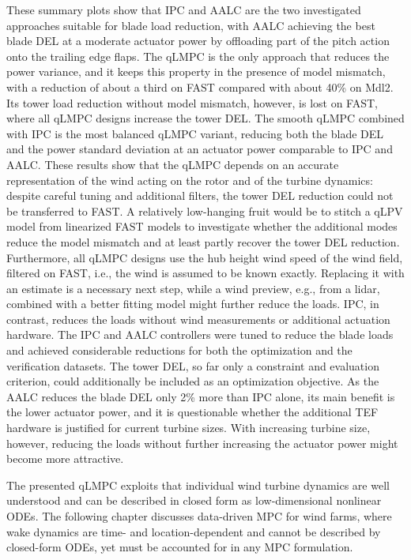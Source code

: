 These summary plots show that IPC and AALC are the two investigated approaches suitable for blade load reduction, with AALC achieving the best blade DEL at a moderate actuator power by offloading part of the pitch action onto the trailing edge flaps. The qLMPC is the only approach that reduces the power variance, and it keeps this property in the presence of model mismatch, with a reduction of about a third on FAST compared with about 40\% on Mdl2. Its tower load reduction without model mismatch, however, is lost on FAST, where all qLMPC designs increase the tower DEL. The smooth qLMPC combined with IPC is the most balanced qLMPC variant, reducing both the blade DEL and the power standard deviation at an actuator power comparable to IPC and AALC.
%
These results show that the qLMPC depends on an accurate representation of the wind acting on the rotor and of the turbine dynamics: despite careful tuning and additional filters, the tower DEL reduction could not be transferred to FAST. A relatively low-hanging fruit would be to stitch a qLPV model from linearized FAST models to investigate whether the additional modes reduce the model mismatch and at least partly recover the tower DEL reduction. Furthermore, all qLMPC designs use the hub height wind speed of the wind field, filtered on FAST, i.e., the wind is assumed to be known exactly. Replacing it with an estimate is a necessary next step, while a wind preview, e.g., from a lidar, combined with a better fitting model might further reduce the loads.
%
IPC, in contrast, reduces the loads without wind measurements or additional actuation hardware. The IPC and AALC controllers were tuned to reduce the blade loads and achieved considerable reductions for both the optimization and the verification datasets. The tower DEL, so far only a constraint and evaluation criterion, could additionally be included as an optimization objective. As the AALC reduces the blade DEL only 2\% more than IPC alone, its main benefit is the lower actuator power, and it is questionable whether the additional TEF hardware is justified for current turbine sizes. With increasing turbine size, however, reducing the loads without further increasing the actuator power might become more attractive.

The presented qLMPC exploits that individual wind turbine dynamics are well understood and can be described in closed form as low-dimensional nonlinear ODEs. The following chapter discusses data-driven MPC for wind farms, where wake dynamics are time- and location-dependent and cannot be described by closed-form ODEs, yet must be accounted for in any MPC formulation.
